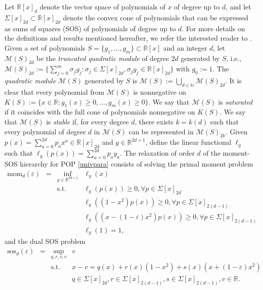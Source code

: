 \documentclass[a4paper,12pt]{article}
\newcommand{\R}{\mathbb{R}} %
\newcommand{\N}{\mathbb{N}} %
\newcommand{\cM}{\mathcal{M}} %
\begin{document}
Let $\R[x]_d$ denote the vector space of polynomials of $x$
of degree up to $d$, and let $\Sigma[x]_{2d} \subset \R[x]_{2d}$ denote the convex cone of polynomials that can be expressed as sums of squares (SOS) of polynomials of degree up to $d$.
{
For more details on the definitions and results mentioned hereafter, we refer the interested reader to \cite{marshall08}. 
Given a set of polynomials $S = \{g_1, \dots, g_m\} \subset \R[x]$ and an integer $d$, let $\cM(S)_{2 d}$ be the \textit{truncated quadratic module} of degree $2d$ generated by $S$, i.e., $\cM(S)_{2d} := \{\sum_{j=0}^m \sigma_j g_j :  \sigma_j \in \Sigma[x]_{2d},
\sigma_j g_j \in \R[x]_{2d}  \}$ with $g_0:=1$.
The \textit{quadratic module} $\cM(S)$ generated by $S$ is $\cM(S) := \bigcup_{d \in \N} \cM(S)_{2d}$. 
It is clear that every polynomial from $\cM(S)$ is nonnegative on $K(S) := \{x \in \R : g_1(x) \geq 0,\dots, g_m(x) \geq 0 \}$. 
We say that $\cM(S)$ is \textit{saturated} if it coincides with the full cone of polynomials  nonnegative on $K(S)$. 
We say that $\cM(S)$ is \textit{stable} if, for every degree $d$, there exists $k=k(d)$ such that every polynomial of degree $d$ in $\cM(S)$ can be represented in $\cM(S)_{2k}$.
}
Given $p(x)=\sum_{a=0}^{2d} p_a x^a \in \R[x]_{2d}$ and $y \in \R^{2d+1}$, define the linear functional $\ell_y$ such that $\ell_y(p(x))=\sum_{a=0}^{2d} p_a y_a$.
The relaxation of order $d$  of the moment-SOS hierarchy for POP \eqref{univpara}  consists of solving the primal moment problem
%
\begin{equation}
    \begin{array}{rcll}
\text{mom}_d(\varepsilon) & = & \inf_{y \in \R^{2d+1}} & \ell_y(x) \\
& &   \mathrm{s.t.} & \ell_y(p(x)) \geq 0, \forall p \in \Sigma[x]_{2d} \\
& & & \ell_y((1-x^2)p(x)) \geq 0, \forall p \in \Sigma[x]_{2(d-1)} \\
& & & \ell_y((x-(1-\varepsilon)x^2)p(x)) \geq 0, \forall p \in \Sigma[x]_{2(d-1)} \\
& & & \ell_y(1)=1 , 
    \end{array}
\end{equation}
and the dual SOS problem
\begin{equation}
    \label{eq:SOS_d}
    \begin{array}{rcrl}
\text{sos}_d(\varepsilon) & = & \sup_{q,r,s,v} & v \\  
& &  \mathrm{s.t.} & x-v = q(x) + r(x) (1-x^2) + s(x) (x+(1-\varepsilon)x^2) \\
& & & q \in \Sigma[x]_{2d}, r \in \Sigma[x]_{2(d-1)}, s \in \Sigma[x]_{2(d-1)}, v \in \R.
   \end{array}
   \end{equation}
\end{document}

